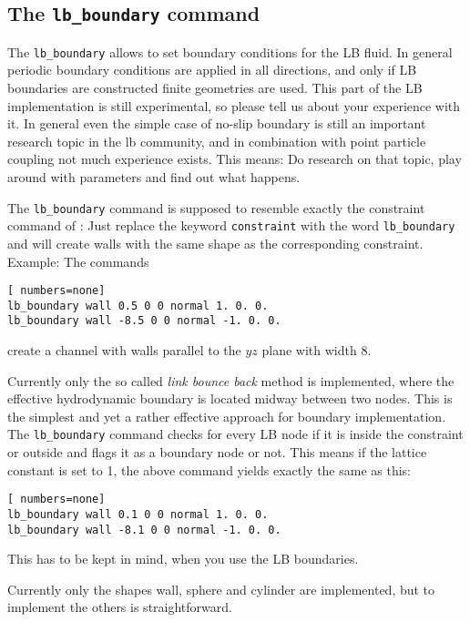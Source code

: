 \subsection*{The \lstinline|lb_boundary| command}
The \lstinline|lb_boundary| allows to set boundary conditions for the LB fluid. In general
periodic boundary conditions are applied in all directions, and only if LB boundaries
are constructed finite geometries are used. This part of the LB implementation is still experimental,
so please tell us about your experience with it. In general even the simple case of no-slip
boundary is still an important research topic in the lb community, and in combination with
point particle coupling not much experience exists. This means: Do research on that topic, play
around with parameters and find out what happens. 


The \lstinline|lb_boundary| command is supposed to resemble exactly the constraint command of 
\ES{}: Just replace the keyword \lstinline|constraint| with the word \lstinline|lb_boundary| 
and \ES{} will create walls with the same shape as the corresponding constraint. Example:
The commands
\begin{lstlisting}[ numbers=none]
lb_boundary wall 0.5 0 0 normal 1. 0. 0. 
lb_boundary wall -8.5 0 0 normal -1. 0. 0. 
\end{lstlisting}
create a channel with walls parallel to the $yz$ plane with width 8.

Currently only the so called \emph{link bounce back} method is implemented, where the effective
hydrodynamic boundary is located midway between two nodes. This is the simplest and yet a 
rather effective approach for boundary implementation. The \lstinline|lb_boundary| command
checks for every LB node if it is inside the constraint or outside and flags it as a boundary
node or not. This means if the lattice constant is set to 1, the above command yields exactly
the same as this:
\begin{lstlisting}[ numbers=none]
lb_boundary wall 0.1 0 0 normal 1. 0. 0. 
lb_boundary wall -8.1 0 0 normal -1. 0. 0. 
\end{lstlisting}
This has to be kept in mind, when you use the LB boundaries.

Currently only the shapes wall, sphere and cylinder are implemented, but to implement the others 
is straightforward.
